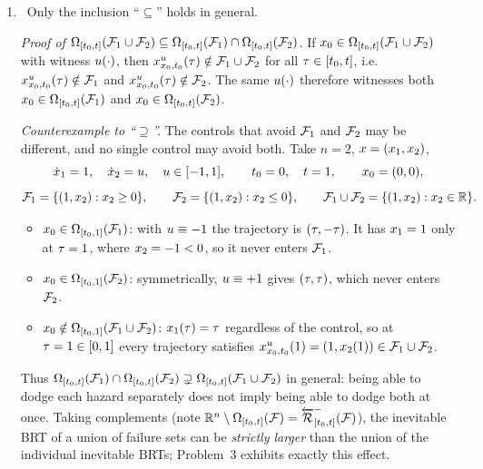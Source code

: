 \begin{enumerate}[label=(\alph*), itemsep=3pt]
\item \FALSE\
Only the inclusion ``$\subseteq$'' holds in general.

\emph{Proof of ${\Omega}_{[{t}_0,{t}]}({\mathcal{F}}_1\cup{\mathcal{F}}_2)\subseteq{\Omega}_{[{t}_0,{t}]}({\mathcal{F}}_1)\cap{\Omega}_{[{t}_0,{t}]}({\mathcal{F}}_2)$.}
If ${x}_0\in{\Omega}_{[{t}_0,{t}]}({\mathcal{F}}_1\cup{\mathcal{F}}_2)$ with witness ${u}(\cdot)$, then
${x}^{{u}}_{{x}_0,{t}_0}({\tau})\notin{\mathcal{F}}_1\cup{\mathcal{F}}_2$ for all ${\tau}\in[{t}_0,{t}]$, i.e.\
${x}^{{u}}_{{x}_0,{t}_0}({\tau})\notin{\mathcal{F}}_1$ and ${x}^{{u}}_{{x}_0,{t}_0}({\tau})\notin{\mathcal{F}}_2$. The same
${u}(\cdot)$ therefore witnesses both ${x}_0\in{\Omega}_{[{t}_0,{t}]}({\mathcal{F}}_1)$ and
${x}_0\in{\Omega}_{[{t}_0,{t}]}({\mathcal{F}}_2)$.

\emph{Counterexample to ``$\supseteq$''.} The controls that avoid ${\mathcal{F}}_1$ and ${\mathcal{F}}_2$ may be
different, and no single control may avoid both. Take $n=2$, ${x}=({x}_1,{x}_2)$,
\[
\dot{{x}}_1=1,\quad \dot{{x}}_2={u},\quad {u}\in[-1,1],\qquad {t}_0=0,\quad {t}=1,\qquad
{x}_0=(0,0),
\]
\[
{\mathcal{F}}_1=\{(1,{x}_2):{x}_2\ge0\},\qquad
{\mathcal{F}}_2=\{(1,{x}_2):{x}_2\le0\},\qquad
{\mathcal{F}}_1\cup{\mathcal{F}}_2=\{(1,{x}_2):{x}_2\in\mathbb{R}\}.
\]
\begin{itemize}[itemsep=0pt]
\item ${x}_0\in{\Omega}_{[{t}_0,1]}({\mathcal{F}}_1)$: with ${u}\equiv-1$ the trajectory is $({\tau},-{\tau})$. It has
      ${x}_1=1$ only at ${\tau}=1$, where ${x}_2=-1<0$, so it never enters ${\mathcal{F}}_1$.
\item ${x}_0\in{\Omega}_{[{t}_0,1]}({\mathcal{F}}_2)$: symmetrically, ${u}\equiv+1$ gives $({\tau},{\tau})$, which
      never enters ${\mathcal{F}}_2$.
\item ${x}_0\notin{\Omega}_{[{t}_0,1]}({\mathcal{F}}_1\cup{\mathcal{F}}_2)$: ${x}_1({\tau})={\tau}$ regardless of the
      control, so at ${\tau}=1\in[0,1]$ every trajectory satisfies
      ${x}^{{u}}_{{x}_0,{t}_0}(1)=(1,{x}_2(1))\in{\mathcal{F}}_1\cup{\mathcal{F}}_2$.
\end{itemize}
Thus ${\Omega}_{[{t}_0,{t}]}({\mathcal{F}}_1)\cap{\Omega}_{[{t}_0,{t}]}({\mathcal{F}}_2)\supsetneq{\Omega}_{[{t}_0,{t}]}({\mathcal{F}}_1\cup{\mathcal{F}}_2)$
in general: being able to dodge each hazard separately does not imply being able to dodge both at
once. Taking complements (note $\mathbb{R}^n\setminus{\Omega}_{[{t}_0,{t}]}({\mathcal{F}})={\overleftarrow{{\mathcal{R}}}}^-_{[{t}_0,{t}]}({\mathcal{F}})$),
the inevitable BRT of a union of failure sets can be \emph{strictly larger} than the union of the
individual inevitable BRTs; Problem~3 exhibits exactly this effect.

\end{enumerate}
